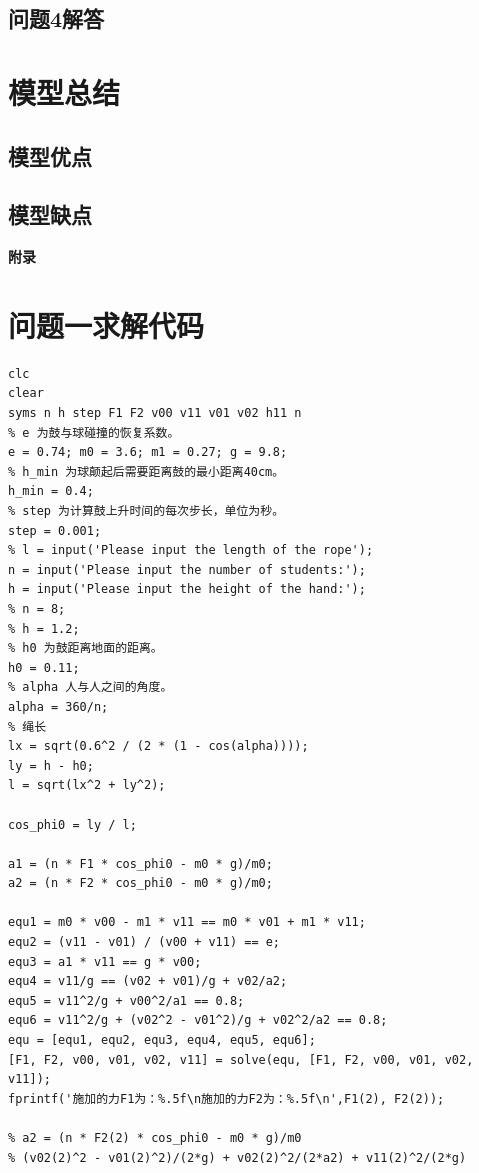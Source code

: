 \documentclass{cumcm}
\begin{document}
\subsection{问题4解答}
\section{模型总结}

\subsection{模型优点}

\subsection{模型缺点}




\begin{thebibliography}{99}
\end{thebibliography}

\newpage
\appendix
\textbf{附录}
\section{问题一求解代码}
\begin{lstlisting}
clc
clear
syms n h step F1 F2 v00 v11 v01 v02 h11 n
% e 为鼓与球碰撞的恢复系数。
e = 0.74; m0 = 3.6; m1 = 0.27; g = 9.8; 
% h_min 为球颠起后需要距离鼓的最小距离40cm。
h_min = 0.4;
% step 为计算鼓上升时间的每次步长，单位为秒。
step = 0.001;
% l = input('Please input the length of the rope');
n = input('Please input the number of students:');
h = input('Please input the height of the hand:');
% n = 8; 
% h = 1.2;
% h0 为鼓距离地面的距离。
h0 = 0.11;
% alpha 人与人之间的角度。
alpha = 360/n;
% 绳长
lx = sqrt(0.6^2 / (2 * (1 - cos(alpha))));
ly = h - h0;
l = sqrt(lx^2 + ly^2);

cos_phi0 = ly / l;

a1 = (n * F1 * cos_phi0 - m0 * g)/m0;
a2 = (n * F2 * cos_phi0 - m0 * g)/m0;

equ1 = m0 * v00 - m1 * v11 == m0 * v01 + m1 * v11;
equ2 = (v11 - v01) / (v00 + v11) == e;
equ3 = a1 * v11 == g * v00;
equ4 = v11/g == (v02 + v01)/g + v02/a2;
equ5 = v11^2/g + v00^2/a1 == 0.8;
equ6 = v11^2/g + (v02^2 - v01^2)/g + v02^2/a2 == 0.8;
equ = [equ1, equ2, equ3, equ4, equ5, equ6];
[F1, F2, v00, v01, v02, v11] = solve(equ, [F1, F2, v00, v01, v02, v11]);
fprintf('施加的力F1为：%.5f\n施加的力F2为：%.5f\n',F1(2), F2(2));

% a2 = (n * F2(2) * cos_phi0 - m0 * g)/m0
% (v02(2)^2 - v01(2)^2)/(2*g) + v02(2)^2/(2*a2) + v11(2)^2/(2*g)
\end{lstlisting}
\end{document}
